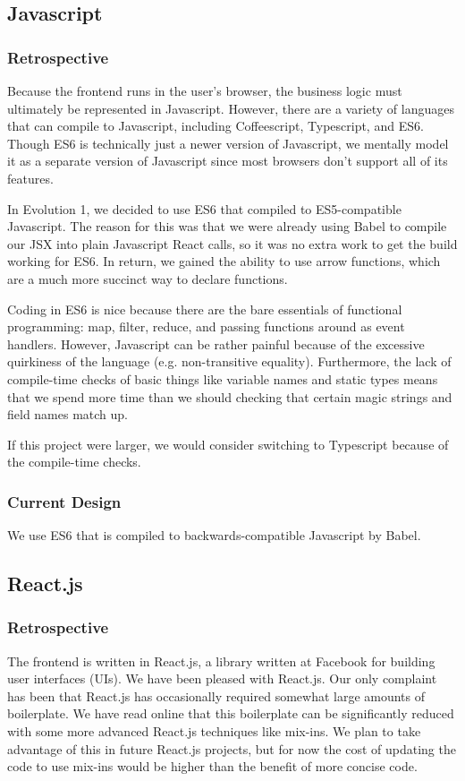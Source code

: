 \documentclass[12pt]{article}
\begin{document}
\subsection{Javascript}
\subsubsection{Retrospective}
Because the frontend runs in the user's browser, the business logic must ultimately be represented in Javascript. However, there are a variety of languages that can compile to Javascript, including Coffeescript, Typescript, and ES6. Though ES6 is technically just a newer version of Javascript, we mentally model it as a separate version of Javascript since most browsers don't support all of its features.

In Evolution 1, we decided to use ES6 that compiled to ES5-compatible Javascript. The reason for this was that we were already using Babel to compile our JSX into plain Javascript React calls, so it was no extra work to get the build working for ES6. In return, we gained the ability to use arrow functions, which are a much more succinct way to declare functions.

Coding in ES6 is nice because there are the bare essentials of functional programming: map, filter, reduce, and passing functions around as event handlers. However, Javascript can be rather painful because of the excessive quirkiness of the language (e.g. non-transitive equality). Furthermore, the lack of compile-time checks of basic things like variable names and static types means that we spend more time than we should checking that certain magic strings and field names match up.

If this project were larger, we would consider switching to Typescript because of the compile-time checks.

\subsubsection{Current Design}
We use ES6 that is compiled to backwards-compatible Javascript by Babel.

\subsection{React.js}
\subsubsection{Retrospective}
The frontend is written in React.js, a library written at Facebook for building user interfaces (UIs). We have been pleased with React.js. Our only complaint has been that React.js has occasionally required somewhat large amounts of boilerplate. We have read online that this boilerplate can be significantly reduced with some more advanced React.js techniques like mix-ins. We plan to take advantage of this in future React.js projects, but for now the cost of updating the code to use mix-ins would be higher than the benefit of more concise code.
\end{document}
